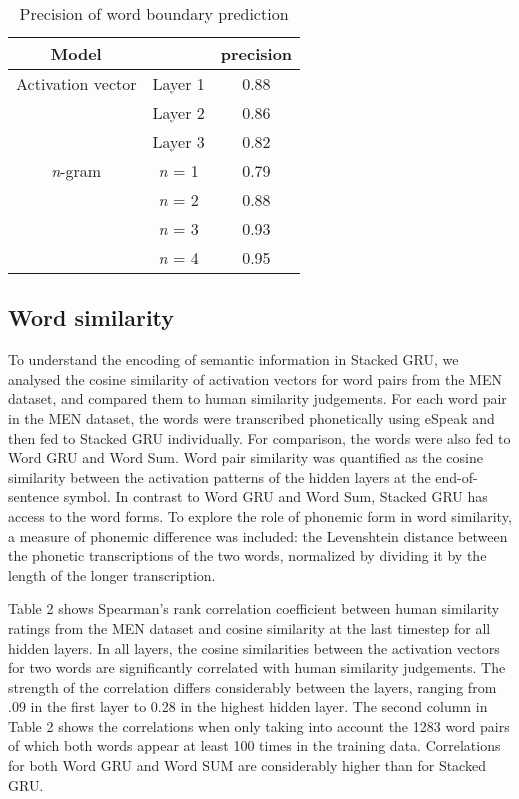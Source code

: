 \begin{table}[]
	\centering
	\begin{tabular}{ccc}
		Model & & precision \\
		\hline
		Activation vector & Layer 1 & 0.88 \\
		& Layer 2 & 0.86 \\
		& Layer 3 & 0.82 \\
		\hline
		\textit{n}-gram & \textit{n} = 1 & 0.79 \\
		& \textit{n} = 2 & 0.88 \\
		& \textit{n} = 3 & 0.93 \\
		& \textit{n} = 4 & 0.95
	\end{tabular}
	\caption{Precision of word boundary prediction}
\end{table}


\subsection{Word similarity}
To understand the encoding of semantic information in {\sc Stacked GRU}, we analysed the cosine similarity of activation vectors for word pairs from the MEN dataset, and compared them to human similarity judgements.
For each word pair in the MEN dataset, the words were transcribed phonetically using eSpeak and then fed to {\sc Stacked GRU} individually. For comparison, the words were also fed to {\sc Word GRU} and {\sc Word Sum}. Word pair similarity was quantified as the cosine similarity between the activation patterns of the hidden layers at the end-of-sentence symbol.
In contrast to {\sc Word GRU} and {\sc Word Sum}, {\sc Stacked GRU} has access to the word forms. To explore the role of phonemic form in word similarity, a measure of phonemic difference was included: the Levenshtein distance between the phonetic transcriptions of the two words, normalized by dividing it by the length of the longer transcription. 

Table 2 shows Spearman's rank correlation coefficient between human similarity ratings from the MEN dataset and cosine similarity at the last timestep for all hidden layers. In all layers, the cosine similarities between the activation vectors for two words are significantly correlated with human similarity judgements. The strength of the correlation differs considerably between the layers, ranging from .09 in the first layer to 0.28 in the highest hidden layer. The second column in Table 2 shows the correlations when only taking into account the 1283 word pairs of which both words appear at least 100 times in the training data. 
Correlations for both {\sc Word GRU} and {\sc Word SUM} are considerably higher than for {\sc Stacked GRU}.

